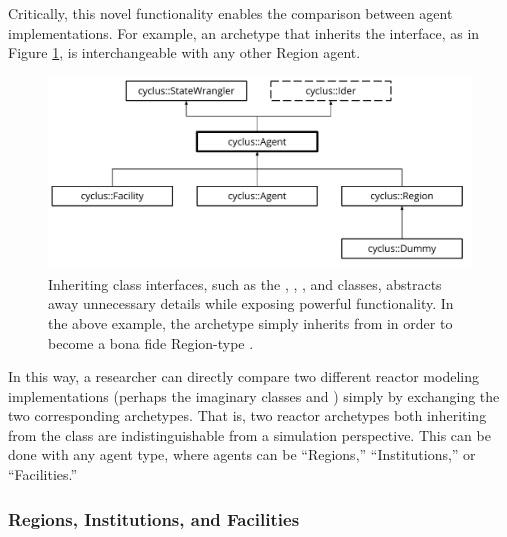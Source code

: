 Critically, this novel functionality enables the comparison
between agent implementations. For example, 
an archetype that inherits the  interface, as in Figure
\ref{fig:agent_uml}, is interchangeable with any other Region agent.


\begin{figure}[htbp!]
\begin{center}
\includegraphics[width=\textwidth]{./images/agent_uml}
\end{center}
\caption{Inheriting \Cyclus class interfaces, such as the ,
, , and  classes, abstracts away
unnecessary details while exposing powerful functionality. In the above
example, the  archetype simply inherits from  in
order to become a bona fide Region-type .}
\label{fig:agent_uml}
\end{figure}

In this way, a researcher can directly compare two different reactor modeling
implementations (perhaps the imaginary classes  and )
simply by exchanging the two corresponding archetypes. That is, two reactor
archetypes both inheriting from the  class are indistinguishable
from a simulation perspective.  This can be done with any agent type, where agents can be ``Regions,'' ``Institutions,'' or ``Facilities.''

\subsubsection{Regions, Institutions, and Facilities}
\label{sec:rif}

